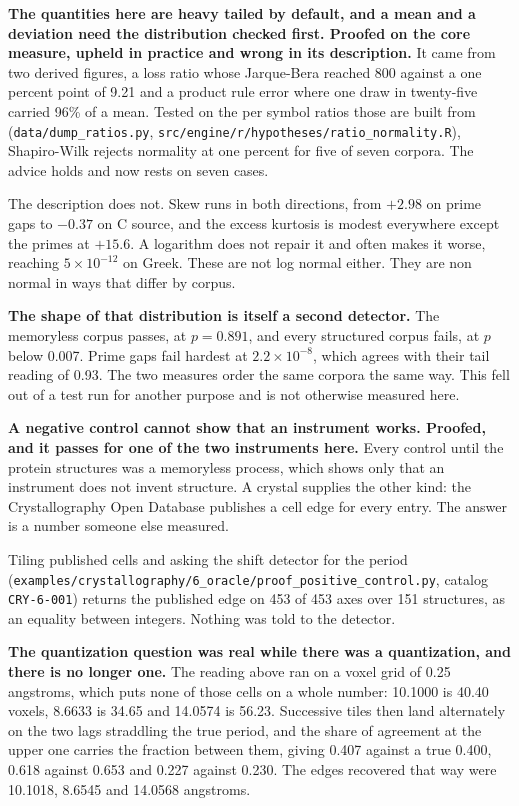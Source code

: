 \textbf{The quantities here are heavy tailed by default, and a mean and a deviation need the distribution checked first. Proofed on the core measure, upheld in practice and wrong in its description.} It came from two derived figures, a loss ratio whose Jarque-Bera reached 800 against a one percent point of 9.21 and a product rule error where one draw in twenty-five carried 96\% of a mean. Tested on the per symbol ratios those are built from (\texttt{data/\allowbreak{}dump\_\allowbreak{}ratios.\allowbreak{}py}, \texttt{src/\allowbreak{}engine/\allowbreak{}r/\allowbreak{}hypotheses/\allowbreak{}ratio\_\allowbreak{}normality.\allowbreak{}R}), Shapiro-Wilk rejects normality at one percent for five of seven corpora. The advice holds and now rests on seven cases.

The description does not. Skew runs in both directions, from \(+2.98\) on prime gaps to \(-0.37\) on C source, and the excess kurtosis is modest everywhere except the primes at \(+15.6\). A logarithm does not repair it and often makes it worse, reaching \(5 \times 10^{-12}\) on Greek. These are not log normal either. They are non normal in ways that differ by corpus.

\textbf{The shape of that distribution is itself a second detector.} The memoryless corpus passes, at \(p = 0.891\), and every structured corpus fails, at \(p\) below 0.007. Prime gaps fail hardest at \(2.2 \times 10^{-8}\), which agrees with their tail reading of 0.93. The two measures order the same corpora the same way. This fell out of a test run for another purpose and is not otherwise measured here.

\textbf{A negative control cannot show that an instrument works. Proofed, and it passes for one of the two instruments here.} Every control until the protein structures was a memoryless process, which shows only that an instrument does not invent structure. A crystal supplies the other kind: the Crystallography Open Database publishes a cell edge for every entry. The answer is a number someone else measured.

Tiling published cells and asking the shift detector for the period (\texttt{examples/\allowbreak{}crystallography/\allowbreak{}6\_\allowbreak{}oracle/\allowbreak{}proof\_\allowbreak{}positive\_\allowbreak{}control.\allowbreak{}py}, catalog \texttt{CRY-6-001}) returns the published edge on 453 of 453 axes over 151 structures, as an equality between integers. Nothing was told to the detector.

\textbf{The quantization question was real while there was a quantization, and there is no longer one.} The reading above ran on a voxel grid of 0.25 angstroms, which puts none of those cells on a whole number: 10.1000 is 40.40 voxels, 8.6633 is 34.65 and 14.0574 is 56.23. Successive tiles then land alternately on the two lags straddling the true period, and the share of agreement at the upper one carries the fraction between them, giving 0.407 against a true 0.400, 0.618 against 0.653 and 0.227 against 0.230. The edges recovered that way were 10.1018, 8.6545 and 14.0568 angstroms.


